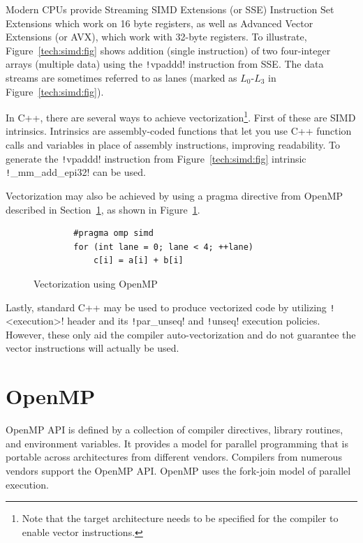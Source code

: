 \documentclass[thesis=M,english]{FITthesis}[2019/12/23]
\newcommand{\csre}[1]{\texttt!#1!}
\begin{document}
Modern CPUs provide Streaming SIMD Extensions (or SSE) Instruction Set Extensions which work on 16 byte
registers, as well as Advanced Vector Extensions (or AVX), which work with 32-byte registers.
To illustrate, Figure~\ref{tech:simd:fig} shows addition (single instruction) of two
four-integer arrays (multiple data) using the \csre{vpaddd} instruction from SSE\@. The data streams
are sometimes referred to as lanes (marked as \(L_0\)-\(L_3\) in Figure~\ref{tech:simd:fig}).

In C++, there are several ways to achieve vectorization\footnote{Note that the target architecture needs
    to be specified for the compiler to enable vector instructions.}.
First of these are SIMD intrinsics. Intrinsics
are assembly-coded functions that let you use C++ function calls and variables in place of assembly
instructions, improving readability. To generate the \csre{vpaddd} instruction from Figure~\ref{tech:simd:fig}
intrinsic \csre{_mm_add_epi32} can be used.

Vectorization may also be achieved by using a pragma directive from OpenMP described in Section~\ref{tech:omp},
as shown in Figure~\ref{tech:simd:omp}.

\begin{figure}[htp]
    \centering
    \begin{verbatim}
        #pragma omp simd
        for (int lane = 0; lane < 4; ++lane)
            c[i] = a[i] + b[i]
    \end{verbatim}
    \caption{Vectorization using OpenMP}\label{tech:simd:omp}
\end{figure}

Lastly, standard C++ may be used to produce vectorized code by utilizing \csre{<execution>} header
and its \csre{par_unseq} and \csre{unseq} execution policies. However, these only aid the compiler
auto-vectorization and do not guarantee the vector instructions will actually be used.


\section{OpenMP}\label{tech:omp}

OpenMP API is defined by a collection of compiler directives, library routines, and environment variables.
It provides a model for parallel programming that is portable across architectures
from different vendors. Compilers from numerous vendors support the OpenMP API\cite{openmp18}.
OpenMP uses the fork-join model of parallel execution.
\end{document}
